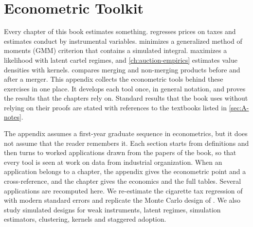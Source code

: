 \chapter{Econometric Toolkit}\label{app:econometrics}

Every chapter of this book estimates something.  regresses prices on taxes and estimates conduct
by instrumental variables.  minimizes a generalized method of moments (GMM) criterion that contains a
simulated integral.
 maximizes a likelihood with latent cartel regimes, and \cref{ch:auction-empirics}
estimates value densities with kernels.  compares merging and non-merging products before and after
a merger. This appendix collects the econometric tools behind these exercises in one place. It develops each tool
once, in general notation, and proves the results that the chapters rely on. Standard results that the book uses
without relying on their proofs are stated with references to the textbooks listed in \cref{sec:A-notes}.

The appendix assumes a first-year graduate sequence in econometrics, but it does not assume that the reader remembers
it. Each section starts from definitions and then turns to worked applications drawn from the papers of the book, so
that every tool is seen at work on data from industrial organization. When an application belongs to a chapter, the
appendix gives the econometric point and a cross-reference, and the chapter gives the economics and the full tables.
Several applications are recomputed here. We re-estimate the cigarette tax regression of \citet{Sumner1981} with
modern standard errors and replicate the Monte Carlo design of \citet{GuerrePerrigneVuong2000}. We also study
simulated designs for weak instruments, latent regimes, simulation estimators, clustering, kernels and staggered
adoption.

